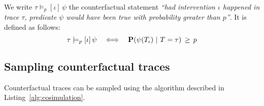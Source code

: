 \begin{definition} We write
  $\tau \models_p [\iota] \, \psi$ the counterfactual statement
  \textit{``had intervention $\iota$ happened in trace $\tau$,
    predicate $\psi$ would have been true with probability greater
    than $p$''}.  It is defined as follows:
  \[ \tau \models_p [\iota] \, \psi \quad \Longleftrightarrow \quad
    \mathbf{P}( \psi({T_\iota}{}) \ |\ T = \tau) \,\geq\, p \]
\end{definition}

\subsection{Sampling counterfactual traces}

Counterfactual traces can be sampled using the algorithm described in
Listing~\ref{alg:cosimulation}.


